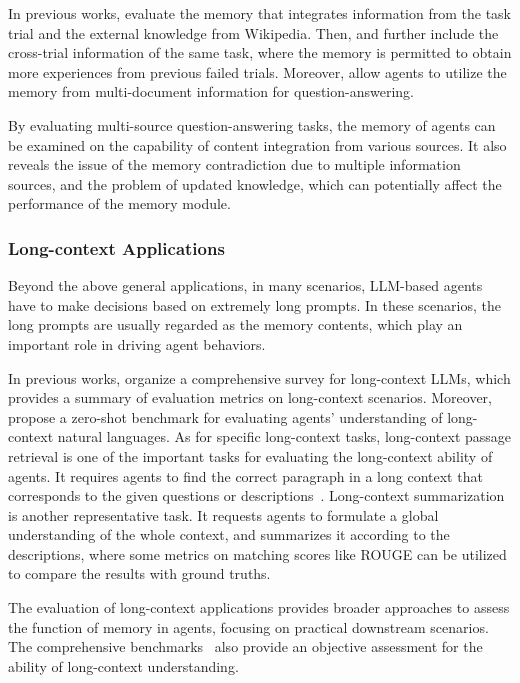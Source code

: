 \documentclass{article}
\theoremstyle{definition}
\theoremstyle{theorem}
\theoremstyle{proof}
\theoremstyle{remark}
\begin{document}
	In previous works, \citet{react} evaluate the memory that integrates information from the task trial and the external knowledge from Wikipedia. Then, \citet{reflexion} and \citet{retroformer} further include the cross-trial information of the same task, where the memory is permitted to obtain more experiences from previous failed trials. Moreover, \citet{memgpt} allow agents to utilize the memory from multi-document information for question-answering.
	
	By evaluating multi-source question-answering tasks, the memory of agents can be examined on the capability of content integration from various sources. It also reveals the issue of the memory contradiction due to multiple information sources, and the problem of updated knowledge, which can potentially affect the performance of the memory module.
	
	\subsubsection{Long-context Applications}
	Beyond the above general applications, in many scenarios, LLM-based agents have to make decisions based on extremely long prompts. 
	In these scenarios, the long prompts are usually regarded as the memory contents, which play an important role in driving agent behaviors.
	
	In previous works, \citet{survey_long_context_llm} organize a comprehensive survey for long-context LLMs, which provides a summary of evaluation metrics on long-context scenarios. Moreover, \citet{zeroscrolls} propose a zero-shot benchmark for evaluating agents' understanding of long-context natural languages. 
	As for specific long-context tasks, long-context passage retrieval is one of the important tasks for evaluating the long-context ability of agents. It requires agents to find the correct paragraph in a long context that corresponds to the given questions or descriptions~\cite{longbench}. Long-context summarization is another representative task. It requests agents to formulate a global understanding of the whole context, and summarizes it according to the descriptions, where some metrics on matching scores like ROUGE can be utilized to compare the results with ground truths.
	
	The evaluation of long-context applications provides broader approaches to assess the function of memory in agents, focusing on practical downstream scenarios. The comprehensive benchmarks~\cite{zeroscrolls,longeval} also provide an objective assessment for the ability of long-context understanding.
	
\end{document}
